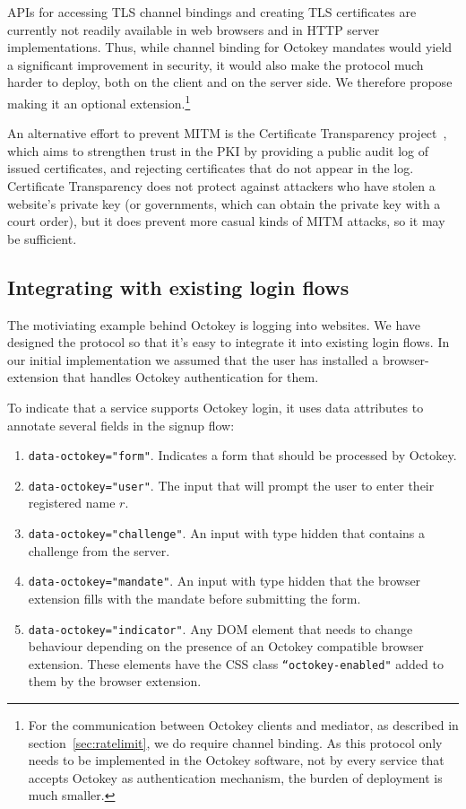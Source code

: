 APIs for accessing TLS channel bindings and creating TLS certificates are currently not readily
available in web browsers and in HTTP server implementations. Thus, while channel binding for
Octokey mandates would yield a significant improvement in security, it would also make the protocol
much harder to deploy, both on the client and on the server side. We therefore propose making it an
optional extension.\footnote{For the communication between Octokey clients and mediator, as
described in section~\ref{sec:ratelimit}, we do require channel binding. As this protocol only needs
to be implemented in the Octokey software, not by every service that accepts Octokey as
authentication mechanism, the burden of deployment is much smaller.}

An alternative effort to prevent MITM is the Certificate Transparency project~\cite{CertTrans},
which aims to strengthen trust in the PKI by providing a public audit log of issued certificates,
and rejecting certificates that do not appear in the log. Certificate Transparency does not protect
against attackers who have stolen a website's private key (or governments, which can obtain the
private key with a court order), but it does prevent more casual kinds of MITM attacks, so it may be
sufficient.

\subsection{Integrating with existing login flows}\label{sect:html}

The motiviating example behind Octokey is logging into websites. We have designed the protocol so that
it's easy to integrate it into existing login flows. In our initial implementation we assumed that the
user has installed a browser-extension that handles Octokey authentication for them.

To indicate that a service supports Octokey login, it uses data attributes to annotate several fields
in the signup flow:

\begin{enumerate}
\item \texttt{data-octokey="form"}. Indicates a form that should be processed by Octokey.
\item \texttt{data-octokey="user"}. The input that will prompt the user to enter their registered name $r$.
\item \texttt{data-octokey="challenge"}. An input with type hidden that contains a challenge from the server.
\item \texttt{data-octokey="mandate"}. An input with type hidden that the browser extension fills with the
mandate before submitting the form.
\item \texttt{data-octokey="indicator"}. Any DOM element that needs to change behaviour depending on the presence
of an Octokey compatible browser extension. These elements have the CSS class \texttt{``octokey-enabled"} added
to them by the browser extension.
\end{enumerate}

